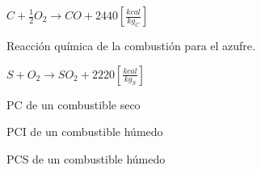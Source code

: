 \documentclass[11pt,a4paper]{article}
\newcommand{\vs}{\vspace{-.3cm}}
\begin{document}
\begin{multicols}{2}
\begin{cajita}
		$C + \frac{1}{2} O_2 \rightarrow CO + \boxed{2440} \left[\frac{kcal}{kg_C}\right]$
			
		\vspace{-.8cm}
		
		\begin{flushleft}
			Reacción química de la combustión para el azufre.
		\end{flushleft}\vs
	
		$S + O_2 \rightarrow SO_2 + \boxed{2220} \left[\frac{kcal}{kg_S}\right] $
		
		\end{cajita}
		\columnbreak
		\begin{cajita}
			
			\vspace{-.8cm}
			
			\begin{flushleft}
				PC de un combustible seco
			\end{flushleft}
			
			\vspace{-.2cm}
		
			
			\begin{flushleft}
				PCI de un combustible húmedo
			\end{flushleft}
			
			\vspace{-.2cm}
			
			
			
			\vspace{-.8cm}
			
			\begin{flushleft}
				PCS de un combustible húmedo
			\end{flushleft}
		
			\vspace{-.2cm}
			
			
			
			\vspace{-.8cm}
			

\end{cajita}
\end{multicols}
\end{document}
